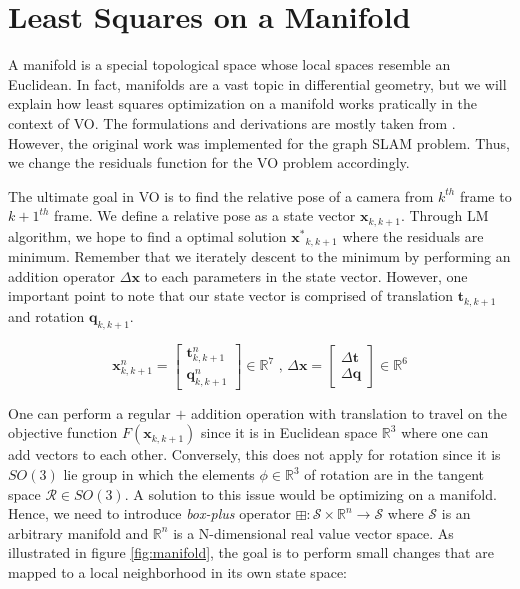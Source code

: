 \documentclass[a4paper]{report}
\numberwithin{figure}{section}
\newcommand{\R}{\mathbb{R}}
\begin{document}
\section{Least Squares on a Manifold}\label{sc_lsq_manifold}

A manifold is a special topological space whose local spaces resemble an Euclidean.
In fact, manifolds are a vast topic in differential geometry, but
we will explain how least squares optimization on 
a manifold works pratically in the context of VO. The formulations and 
derivations are mostly taken from \parencite{Sol2016}. However, 
the original work was implemented for the graph SLAM problem. Thus, 
we change the residuals function for the VO problem accordingly. 

The ultimate goal in VO is to find the relative pose of a camera from 
$k^{th}$ frame to $k+1^{th}$ frame. 
We define a relative pose as a state vector $\mathbf{x}_{k,k+1}$. 
Through LM algorithm, we hope to 
find a optimal solution $\mathbf{x^*}_{k,k+1}$ where the residuals are minimum.
Remember that we iterately descent to the minimum by performing an 
addition operator $\Delta \mathbf{x}$ to each parameters in the state vector. 
However, one important point to note that our state vector is comprised of 
translation $\mathbf{t}_{k,k+1}$ and rotation $\mathbf{q}_{k,k+1}$. 

\begin{equation}
  \mathbf{x}^n_{k,k+1} = \begin{bmatrix} \mathbf{t}^n_{k,k+1} \\ \mathbf{q}^n_{k,k+1} \end{bmatrix} \in \R^7
  \text{ ,   } 
  \Delta \mathbf{x} = \begin{bmatrix} \Delta \mathbf{t} \\ \Delta \mathbf{q} \end{bmatrix} \in \R^6
\end{equation}

One can perform a regular $+$ addition operation with translation 
to travel on the objective function $F(\mathbf{x}_{k,k+1})$ since 
it is in Euclidean space $\R^3$ where one can add vectors to each other. 
Conversely, this does not apply for rotation 
since it is $SO(3)$ lie group in which the elements $\phi \in \R^3$ of rotation 
are in the tangent space $\mathcal{R} \in SO(3)$.
A solution to this issue would be optimizing on a manifold.
Hence, we need to introduce \textit{box-plus} operator
$\boxplus : \mathcal{S} \times \R^n \rightarrow \mathcal{S}$ where $\mathcal{S}$ 
is an arbitrary manifold and $\R^n$ is a N-dimensional real value vector space. 
As illustrated in figure \ref{fig:manifold}, 
the goal is to perform small changes that are mapped to a local neighborhood in 
its own state space:
\end{document}
